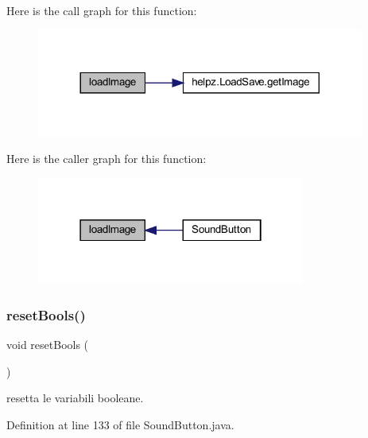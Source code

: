 Here is the call graph for this function\+:
\nopagebreak
\begin{figure}[H]
\begin{center}
\leavevmode
\includegraphics[width=305pt]{classui_1_1_sound_button_aeee4cf1bbe51fdc2f9c344e4c20cee76_cgraph}
\end{center}
\end{figure}
Here is the caller graph for this function\+:\nopagebreak
\begin{figure}[H]
\begin{center}
\leavevmode
\includegraphics[width=250pt]{classui_1_1_sound_button_aeee4cf1bbe51fdc2f9c344e4c20cee76_icgraph}
\end{center}
\end{figure}
\mbox{\label{classui_1_1_sound_button_a4506144774b5a18385cf2eb0f4ff5e42}} 
\subsubsection{\texorpdfstring{reset\+Bools()}{resetBools()}}
{\footnotesize\ttfamily void reset\+Bools (\begin{DoxyParamCaption}{ }\end{DoxyParamCaption})}



resetta le variabili booleane. 



Definition at line 133 of file Sound\+Button.\+java.

\mbox{\label{classui_1_1_sound_button_ad6f3328519bbc954f7973bc885d088d8}} 
